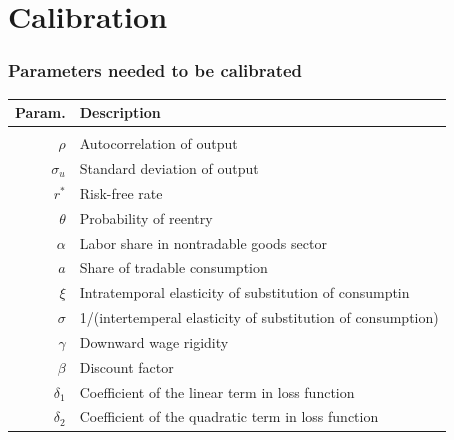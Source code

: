 \documentclass[mathserif]{beamer}
\begin{document}
    \section{Calibration}
    \begin{frame}
        \frametitle{Parameters needed to be calibrated}
        \begin{tabular}[t]{r l}
            Param. & Description \\
            \hline\\
            $\rho$     & Autocorrelation of output\\
            $\sigma_u$ & Standard deviation of output\\
            $r^*$      & Risk-free rate\\
            $\theta$   & Probability of reentry\\
            $\alpha$   & Labor share in nontradable goods sector\\
            $a$        & Share of tradable consumption\\
            $\xi$      & Intratemporal elasticity of substitution of consumptin\\
            $\sigma$   & 1/(intertemperal elasticity of substitution of consumption)\\
            $\gamma$   & Downward wage rigidity\\
            $\beta$    & Discount factor\\
            $\delta_1$ & Coefficient of the linear term in loss function\\
            $\delta_2$ & Coefficient of the quadratic term in loss function\\

            \end{tabular}
    \end{frame}
\end{document}
